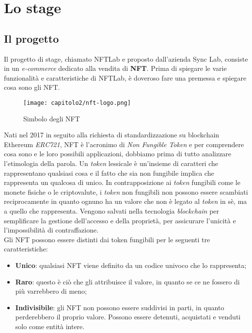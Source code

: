 
\chapter{Lo stage}
\label{cap:stage}


\section{Il progetto}
Il progetto di stage, chiamato NFTLab e proposto dall'azienda Sync Lab, consiste in un \textit{e-commerce} dedicato alla vendita di \textbf{NFT}. Prima di spiegare le varie funzionalità e caratteristiche di NFTLab, è doveroso fare una premessa e spiegare cosa sono gli NFT. \\

\begin{figure}[!h]
  \centering
  \texttt{[image: capitolo2/nft-logo.png]}
  \caption{Simbolo degli NFT}
\end{figure}

Nati nel 2017 in seguito alla richiesta di standardizzazione su blockchain Ethereum \textit{ERC721}, NFT è l'acronimo di \textit{Non Fungible Token} e per comprendere cosa sono e le loro possibili applicazioni, dobbiamo prima di tutto analizzare l'etimologia della parola.
Un \textit{token} lessicale è un'insieme di caratteri che rappresentano qualsiasi cosa e il fatto che sia non fungibile implica che rappresenta un qualcosa di unico.
In contrapposizione ai \textit{token} fungibili come le monete fisiche o le \gls{criptovalute}, i \textit{token} non fungibili non possono essere scambiati reciprocamente in quanto ognuno ha un valore che non è legato al \textit{token} in sè, ma a quello che rappresenta.
Vengono salvati nella tecnologia \textit{blockchain} per semplificare la gestione dell'accesso e della proprietà, per assicurare l'unicità e l'impossibilità di contraffazione. \\

\noindent Gli NFT possono essere distinti dai token fungibili per le seguenti tre caratteristiche:
\begin{itemize}
  \item \textbf{Unico}: qualsiasi NFT viene definito da un codice univoco che lo rappresenta;
  \item \textbf{Raro}: questo è ciò che gli attribuisce il valore, in quanto se ce ne fossero di più varrebbero di meno;
  \item \textbf{Indivisibile}: gli NFT non possono essere suddivisi in parti, in quanto perderebbero il proprio valore. Possono essere detenuti, acquistati e venduti solo come entità intere.
\end{itemize}

